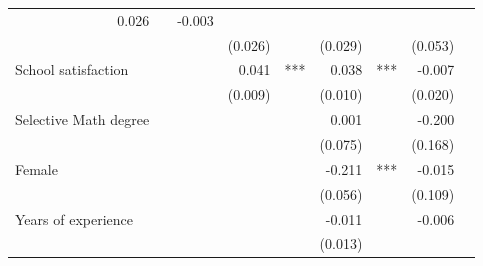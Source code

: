 \documentclass{article}
\begin{document}
\begin{table}[!h]
\begin{tabular}{lllllllll}
  \multicolumn{1}{r}{0.026} &
  \multicolumn{1}{l}{} &
  \multicolumn{1}{r}{-0.003} &
  \multicolumn{1}{l}{} \\
\multicolumn{1}{l}{} &
  \multicolumn{1}{r}{} &
  \multicolumn{1}{l}{} &
  \multicolumn{1}{r}{(0.026)} &
  \multicolumn{1}{l}{} &
  \multicolumn{1}{r}{(0.029)} &
  \multicolumn{1}{l}{} &
  \multicolumn{1}{r}{(0.053)} &
  \multicolumn{1}{l}{} \\
\multicolumn{1}{l}{School satisfaction} &
  \multicolumn{1}{r}{} &
  \multicolumn{1}{l}{} &
  \multicolumn{1}{r}{0.041} &
  \multicolumn{1}{l}{***} &
  \multicolumn{1}{r}{0.038} &
  \multicolumn{1}{l}{***} &
  \multicolumn{1}{r}{-0.007} &
  \multicolumn{1}{l}{} \\
\multicolumn{1}{l}{} &
  \multicolumn{1}{r}{} &
  \multicolumn{1}{l}{} &
  \multicolumn{1}{r}{(0.009)} &
  \multicolumn{1}{l}{} &
  \multicolumn{1}{r}{(0.010)} &
  \multicolumn{1}{l}{} &
  \multicolumn{1}{r}{(0.020)} &
  \multicolumn{1}{l}{} \\
\multicolumn{1}{l}{Selective Math degree} &
  \multicolumn{1}{r}{} &
  \multicolumn{1}{l}{} &
  \multicolumn{1}{r}{} &
  \multicolumn{1}{l}{} &
  \multicolumn{1}{r}{0.001} &
  \multicolumn{1}{l}{} &
  \multicolumn{1}{r}{-0.200} &
  \multicolumn{1}{l}{} \\
\multicolumn{1}{l}{} &
  \multicolumn{1}{r}{} &
  \multicolumn{1}{l}{} &
  \multicolumn{1}{r}{} &
  \multicolumn{1}{l}{} &
  \multicolumn{1}{r}{(0.075)} &
  \multicolumn{1}{l}{} &
  \multicolumn{1}{r}{(0.168)} &
  \multicolumn{1}{l}{} \\
\multicolumn{1}{l}{Female} &
  \multicolumn{1}{r}{} &
  \multicolumn{1}{l}{} &
  \multicolumn{1}{r}{} &
  \multicolumn{1}{l}{} &
  \multicolumn{1}{r}{-0.211} &
  \multicolumn{1}{l}{***} &
  \multicolumn{1}{r}{-0.015} &
  \multicolumn{1}{l}{} \\
\multicolumn{1}{l}{} &
  \multicolumn{1}{r}{} &
  \multicolumn{1}{l}{} &
  \multicolumn{1}{r}{} &
  \multicolumn{1}{l}{} &
  \multicolumn{1}{r}{(0.056)} &
  \multicolumn{1}{l}{} &
  \multicolumn{1}{r}{(0.109)} &
  \multicolumn{1}{l}{} \\
\multicolumn{1}{l}{Years of experience} &
  \multicolumn{1}{r}{} &
  \multicolumn{1}{l}{} &
  \multicolumn{1}{r}{} &
  \multicolumn{1}{l}{} &
  \multicolumn{1}{r}{-0.011} &
  \multicolumn{1}{l}{} &
  \multicolumn{1}{r}{-0.006} &
  \multicolumn{1}{l}{} \\
\multicolumn{1}{l}{} &
  \multicolumn{1}{r}{} &
  \multicolumn{1}{l}{} &
  \multicolumn{1}{r}{} &
  \multicolumn{1}{l}{} &
  \multicolumn{1}{r}{(0.013)} &

\end{tabular}
\end{table}
\end{document}
